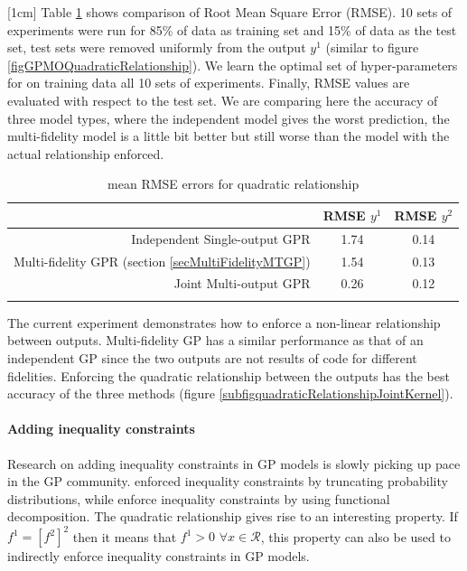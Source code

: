[1cm]
Table \ref{table:rmseY1Y2} shows comparison of Root Mean Square Error (RMSE). 10 sets of experiments were run for 85\% of data as training set and 15\% of data as the test set, test sets were removed uniformly from the output $y^1$ (similar to figure \ref{figGPMOQuadraticRelationship}). We learn the optimal set of hyper-parameters for on training data all 10 sets of experiments. Finally, RMSE values are evaluated with respect to the test set. We are comparing here the accuracy of three model types, where the independent model gives the worst prediction, the multi-fidelity model is a little bit better but still worse than the model with the actual relationship enforced. 

\begin{table}
\caption{mean RMSE errors for quadratic relationship}
\centering
\label{t:observed_psrs}
\begin{tabular}{rcc}
\noalign{\smallskip} \hline \hline \noalign{\smallskip}
 & RMSE \(y^{1}\) & RMSE \(y^{2}\) \\
\hline
Independent Single-output GPR & 1.74 & 0.14 \\
Multi-fidelity GPR (section \ref{secMultiFidelityMTGP})& 1.54 & 0.13 \\
Joint Multi-output GPR & 0.26 & 0.12 \\
\noalign{\smallskip} \hline \noalign{\smallskip}
\end{tabular}
\label{table:rmseY1Y2}
\end{table}

The current experiment demonstrates how to enforce a non-linear relationship between outputs. Multi-fidelity GP has a similar performance as that of an independent GP since the two outputs are not results of code for different fidelities. Enforcing the quadratic relationship between the outputs has the best accuracy of the three methods (figure \ref{subfigquadraticRelationshipJointKernel}). 

\paragraph{Adding inequality constraints}
Research on adding inequality constraints in GP models is slowly picking up pace in the GP community. \cite{da2012gaussian} enforced inequality constraints by truncating probability distributions, while \cite{maatouk2017gaussian} enforce inequality constraints by using functional decomposition. The quadratic relationship gives rise to an interesting property. If  $f^{1} = \left [f^{2} \right]^2$ then it means that $f^{1} > 0$ $\forall x \in \mathcal{R}$, this property can also be used to indirectly enforce inequality constraints in GP models. 

